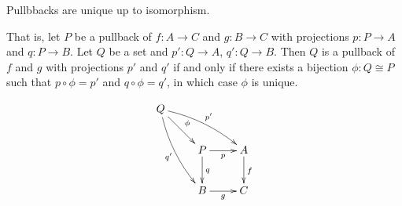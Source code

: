 \begin{prop}
 Pullbbacks are unique up to isomorphism.

 That is, let $P$ be a pullback of $f : A \rightarrow C$ and $g : B
\rightarrow C$ with projections $p : P \rightarrow A$ and $q : P \rightarrow
B$. Let $Q$ be a set and $p' : Q \rightarrow A$, $q' : Q \rightarrow B$. Then
$Q$ is a pullback of $f$ and $g$ with projections $p'$ and $q'$ if and only if
there exists a bijection $\phi : Q \cong P$ such that $p \circ \phi = p'$ and
$q \circ \phi = q'$, in which case $\phi$ is unique.

 \[ \xymatrix{
   Q \ar@/^/[rrd]^{p'} \ar@/_/[ddr]_{q'} \ar[dr]^{\phi} \\
  & P \ar[r]_p \ar[d]^q & A \ar[d]^{f} \\
  & B \ar[r]_g & C
}
 \]

\end{prop}

